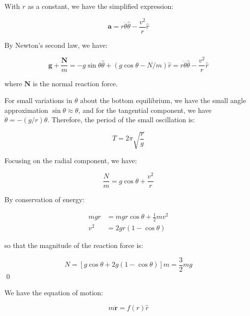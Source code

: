 \documentclass[12pt]{article}
\begin{document}
With $r$ as a constant, we have the simplified expression:

\begin{equation}
    \mathbf{a} = r \ddot{\theta} \hat{\theta} - \frac{v^{2}}{r} \hat{r}
\end{equation}

By Newton's second law, we have:

\begin{equation}
    \mathbf{g} + \frac{\mathbf{N}}{m} = -g \sin{\theta} \hat{\theta} + (g \cos{\theta} - N/m) \hat{r} = r \ddot{\theta} \hat{\theta} - \frac{v^{2}}{r} \hat{r}
\end{equation}

where $\mathbf{N}$ is the normal reaction force.

For small variations in $\theta$ about the bottom equilibrium, we have the small angle approximation $\sin{\theta} \approx \theta$, and for the tangential component, we have $\ddot{\theta} = -(g/r)\theta$. Therefore, the period of the small oscillation is:

\begin{equation}
    T = 2\pi \sqrt{\frac{r}{g}}
\end{equation}

Focusing on the radial component, we have:

\begin{equation}
    \frac{N}{m} = g \cos{\theta} + \frac{v^{2}}{r}
\end{equation}

By conservation of energy:

\begin{equation}
\begin{split}
    mgr &= mgr \cos{\theta} + \frac{1}{2}mv^{2} \\
    v^{2} &= 2gr(1 - \cos{\theta})
\end{split}
\end{equation}

so that the magnitude of the reaction force is:

\begin{equation}
    N = \left[ g \cos{\theta} + 2g(1 - \cos{\theta}) \right] m = \frac{3}{2} mg
\end{equation}
\qed


We have the equation of motion:

\begin{equation}
    m \ddot{\mathbf{r}} = f(r) \hat{r}
\end{equation}
\end{document}
